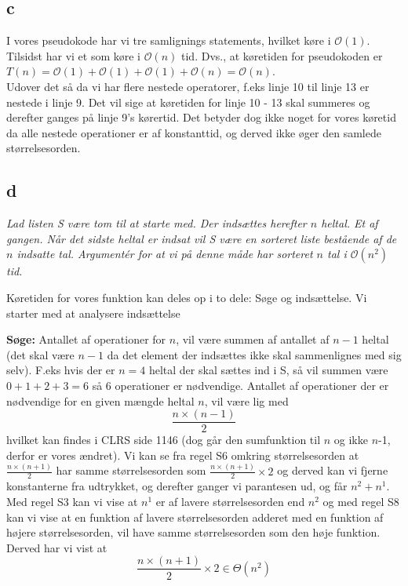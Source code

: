 \documentclass[a4paper]{article}
\begin{document}
\subsection*{c}
I vores pseudokode har vi tre samlignings statements, hvilket køre i $\mathcal{O}(1)$. Tilsidst har vi et  som køre i $\mathcal{O}(n)$ tid. Dvs., at køretiden for pseudokoden er $T(n) = \mathcal{O}(1)+\mathcal{O}(1)+\mathcal{O}(1)+\mathcal{O}(n) = \mathcal{O}(n)$.\\
Udover det så da vi har flere nestede operatorer, f.eks linje 10 til linje 13 er nestede i linje 9. Det vil sige at køretiden for linje 10 - 13 skal summeres og derefter ganges på linje 9's kørertid. Det betyder dog ikke noget for vores køretid da alle nestede operationer er af konstanttid, og derved ikke øger den samlede størrelsesorden. 
\subsection*{d}
\textit{Lad listen S være tom til at starte med. Der indsættes herefter $n$ heltal. Et af gangen. Når det sidste heltal er indsat vil S være en sorteret liste bestående af	de $n$ indsatte tal. Argumentér for at vi på denne måde har sorteret $n$ tal i $\mathcal{O}(n^2)$ tid.}

Køretiden for vores funktion kan deles op i to dele: Søge og indsættelse. Vi starter med at analysere indsættelse 

\textbf{Søge:} Antallet af operationer for $n$, vil være summen af antallet af $n-1$ heltal (det skal være $n-1$ da det element der indsættes ikke skal sammenlignes med sig selv). F.eks hvis der er $n = 4$ heltal der skal sættes ind i S, så vil summen være $0+1+2+3=6$ så 6 operationer er nødvendige. Antallet af operationer der er nødvendige for en given mængde heltal $n$, vil være lig med $$\frac{n\times(n-1)}{2}$$ hvilket kan findes i CLRS side 1146 (dog går den sumfunktion til $n$ og ikke $n$-1, derfor er vores ændret). Vi kan se fra regel S6 omkring størrelsesorden at $\frac{n\times(n+1)}{2}$ har samme størrelsesorden som $\frac{n\times(n+1)}{2}\times2$ og derved kan vi fjerne konstanterne fra udtrykket, og derefter ganger vi parantesen ud, og får $n^2 + n^1$. Med regel S3 kan vi vise at $n^1$ er af lavere størrelsesorden end $n^2$ og med regel S8 kan vi vise at en funktion af lavere størrelsesorden adderet med en funktion af højere størrelsesorden, vil have samme størrelsesorden som den høje funktion. Derved har vi vist at $$\frac{n\times(n+1)}{2}\times2 \in \Theta(n^2)$$ 
\end{document}
